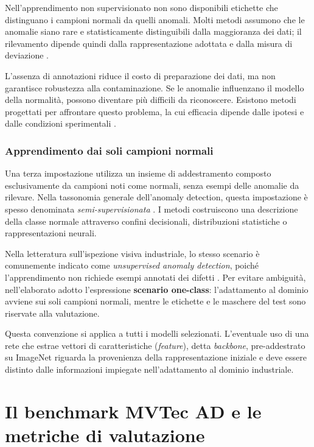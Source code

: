 Nell'apprendimento non supervisionato non sono disponibili etichette che distinguano i campioni normali da quelli anomali. Molti metodi assumono che le anomalie siano rare e statisticamente distinguibili dalla maggioranza dei dati; il rilevamento dipende quindi dalla rappresentazione adottata e dalla misura di deviazione \cite{Pang_et_al._2021}.

L'assenza di annotazioni riduce il costo di preparazione dei dati, ma non garantisce robustezza alla contaminazione. Se le anomalie influenzano il modello della normalità, possono diventare più difficili da riconoscere. Esistono metodi progettati per affrontare questo problema, la cui efficacia dipende dalle ipotesi e dalle condizioni sperimentali \cite{Lin_et_al._2021}.

\subsubsection{Apprendimento dai soli campioni normali}

Una terza impostazione utilizza un insieme di addestramento composto esclusivamente da campioni noti come normali, senza esempi delle anomalie da rilevare. Nella tassonomia generale dell'anomaly detection, questa impostazione è spesso denominata \textit{semi-supervisionata} \cite{Perez_et_al._2021}. I metodi costruiscono una descrizione della classe normale attraverso confini decisionali, distribuzioni statistiche o rappresentazioni neurali.

Nella letteratura sull'ispezione visiva industriale, lo stesso scenario è comunemente indicato come \textit{unsupervised anomaly detection}, poiché l'apprendimento non richiede esempi annotati dei difetti \cite{Cui_et_al._2023}. Per evitare ambiguità, nell'elaborato adotto l'espressione \textbf{scenario one-class}: l'adattamento al dominio avviene sui soli campioni normali, mentre le etichette e le maschere del test sono riservate alla valutazione.

Questa convenzione si applica a tutti i modelli selezionati. L'eventuale uso di una rete che estrae vettori di caratteristiche (\textit{feature}), detta \textit{backbone}, pre-addestrato su ImageNet riguarda la provenienza della rappresentazione iniziale e deve essere distinto dalle informazioni impiegate nell'adattamento al dominio industriale.

\section{Il benchmark MVTec AD e le metriche di valutazione}

